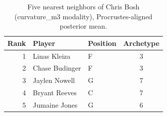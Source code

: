 \begin{table}[htbp]
  \centering\small
  \begin{tabular}{rllc}
    \toprule
    Rank & Player & Position & Archetype \\
    \midrule
    1 & Linas Kleiza & F & 3 \\
    2 & Chase Budinger & F & 3 \\
    3 & Jaylen Nowell & G & 7 \\
    4 & Bryant Reeves & C & 7 \\
    5 & Jumaine Jones & G & 6 \\
    \bottomrule
  \end{tabular}
  \caption{Five nearest neighbors of Chris Bosh (curvature_m3 modality), Procrustes-aligned posterior mean.}
  \label{tab:Chris_Bosh_neighbors_curvature_m3}
\end{table}

